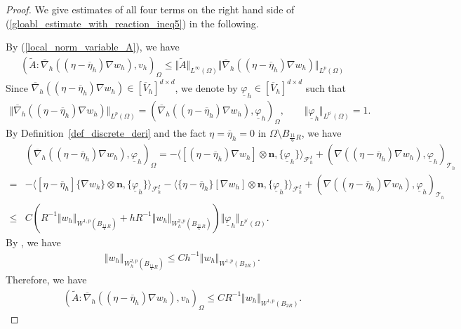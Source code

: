 \documentclass[12pt]{amsart}
\theoremstyle{definition}
\theoremstyle{remark}
\begin{document}
\begin{proof}
We give estimates of all four terms on the right hand side of (\ref{gloabl_estimate_with_reaction_ineq5}) in the following. 

By (\ref{local_norm_variable_A}), we have 
\begin{align*}
(\tilde{A}:\overline{\nabla}_{h}( (\eta - \overline{\eta}_{h} ) \nabla  w_{h}), v_{h})_{\Omega} 
\leq \Vert \tilde{A} \Vert_{L^{\infty}(\Omega)} \Vert \overline{\nabla}_{h}( (\eta - \overline{\eta}_{h} ) 
\nabla  w_{h}) \Vert_{L^{p}(\Omega)}
\end{align*}
Since $\overline{\nabla}_{h}( (\eta - \overline{\eta}_{h} ) \nabla  w_{h}) \in [\overline{V}_{h}]^{d \times d}$, 
we denote by $\underline{\varphi}_{h} \in [\overline{V}_{h}]^{d \times d}$ such that 
\begin{align*}
\Vert \overline{\nabla}_{h}( (\eta - \overline{\eta}_{h} ) \nabla  w_{h}) \Vert_{L^{p}(\Omega)} 
= \left( \overline{\nabla}_{h}( (\eta - \overline{\eta}_{h} ) \nabla  w_{h}),  \underline{\varphi}_{h}\right)_{\Omega}, 
\qquad \Vert \underline{\varphi}_{h} \Vert_{L^{p^{\prime}}(\Omega)} = 1.
\end{align*} 
By Definition~\ref{def_discrete_deri} and the fact
$\eta = \overline{\eta}_{h} = 0$ in $\Omega \setminus B_{\frac{11}{6}R}$, we have 
\begin{align*}
&\left( \overline{\nabla}_{h}( (\eta - \overline{\eta}_{h} ) \nabla  w_{h}),  \underline{\varphi}_{h}\right)_{\Omega} 
= - \langle [(\eta - \overline{\eta}_{h} ) \nabla  w_{h}]\otimes \boldsymbol{n}, \{ \underline{\varphi}_{h} \} 
\rangle_{\mathcal{F}_{h}^{I}} 
+ (\nabla ((\eta - \overline{\eta}_{h} ) \nabla  w_{h}), \underline{\varphi}_{h})_{\mathcal{T}_{h}} \\
= & - \langle [\eta - \overline{\eta}_{h}]\{ \nabla  w_{h}\} \otimes \boldsymbol{n}, \{ \underline{\varphi}_{h} \} 
\rangle_{\mathcal{F}_{h}^{I}} 
- \langle \{\eta - \overline{\eta}_{h}\}  [\nabla  w_{h}]\otimes \boldsymbol{n}, \{ \underline{\varphi}_{h} \} 
\rangle_{\mathcal{F}_{h}^{I}}
+ (\nabla ((\eta - \overline{\eta}_{h} ) \nabla  w_{h}), \underline{\varphi}_{h})_{\mathcal{T}_{h}} \\
\leq & C \left( R^{-1} \Vert w_{h} \Vert_{W^{1,p}(B_{\frac{11}{6}R})} 
+ hR^{-1}\Vert w_{h}\Vert_{W_{h}^{2,p}(B_{\frac{11}{6} R})}\right) \Vert \underline{\varphi}_{h} 
\Vert_{L^{p^{\prime}}(\Omega)}.
\end{align*}
By \cite[Lemma~$2.2$]{FHM2017}, we have 
\begin{align*}
\Vert w_{h}\Vert_{W_{h}^{2,p}(B_{\frac{11}{6} R})} \leq Ch^{-1} \Vert w_{h}\Vert_{W^{1,p}(B_{2R})}.
\end{align*} 
Therefore, we have 
\begin{align}
\label{gloabl_estimate_with_reaction_ineq6}
(\tilde{A}:\overline{\nabla}_{h}( (\eta - \overline{\eta}_{h} ) \nabla  w_{h}), v_{h})_{\Omega}
\leq C R^{-1} \Vert w_{h} \Vert_{W^{1,p}(B_{2R})}.
\end{align}


\end{proof}
\end{document}
